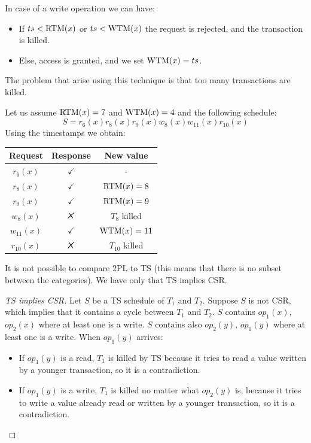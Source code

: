 \documentclass[12pt, a4paper]{report}
\newtheorem[style=M,bodystyle=\normalfont]{theorem}{Theorem}
\newtheorem[style=M,bodystyle=\normalfont]{corollary}{Corollary}
\newtheorem[style=M,bodystyle=\normalfont]{lemma}{Lemma}
\newtheorem[style=M,bodystyle=\normalfont]{definition}{Definition}
\newcommand{\tikzxmark}{%
\tikz[scale=0.23] {
    \draw[line width=0.7,line cap=round] (0,0) to [bend left=6] (1,1);
    \draw[line width=0.7,line cap=round] (0.2,0.95) to [bend right=3] (0.8,0.05);
}}
\begin{document}
    In case of a write operation we can have: 
    \begin{itemize}
        \item If $ts<\textnormal{RTM}(x)$ or $ts<\textnormal{WTM}(x)$ the request is rejected, and the  transaction is killed. 
        \item Else, access is granted, and we set $\textnormal{WTM}(x)=ts$. 
    \end{itemize}
    The problem that arise using this technique is that too many transactions are killed. 
    \begin{example}
        Let us assume $\textnormal{RTM}(x)=7$ and $\textnormal{WTM}(x)=4$ and the following schedule: 
        \[S=r_6(x) r_8(x) r_9(x) w_8(x) w_{11}(x) r_{10}(x)\]
        Using the timestamps we obtain: 
        \begin{table}[H]
            \centering
            \begin{tabular}{ccc}
            \textbf{Request} & \textbf{Response} & \textbf{New value} \\ \hline
            $r_6(x)$         & $\checkmark$      & -                  \\
            $r_8(x)$         & $\checkmark$      & $\textnormal{RTM}(x)=8$         \\
            $r_9(x)$         & $\checkmark$      & $\textnormal{RTM}(x)=9$         \\
            $w_8(x)$         & $\tikzxmark$      & $T_8$ killed       \\
            $w_{11}(x)$      & $\checkmark$      & $\textnormal{WTM}(x)=11$        \\
            $r_{10}(x)$      & $\tikzxmark$      & $T_{10}$ killed   
            \end{tabular}
        \end{table}
    \end{example}
    It is not possible to compare 2PL to TS (this means that there is no subset between the categories). We have only that TS implies CSR. 
    \begin{proof}[TS implies CSR]
        Let $S$ be a TS schedule of $T_1$ and $T_2$. Suppose $S$ is not CSR, which implies that it contains a cycle between $T_1$ and $T_2$. $S$ contains $op_1(x)$, $op_2(x)$ where at 
        least one is a write. $S$ contains also $op_2(y)$, $op_1(y)$ where at least one is a write. 
        When $op_1(y)$ arrives:
        \begin{itemize}
            \item If $op_1(y)$ is a read, $T_1$ is killed by TS because it tries to read a value written by a younger transaction, so it is a contradiction. 
            \item If $op_1(y)$ is a write, $T_1$ is killed no matter what $op_2(y)$ is, because it tries to write a value already read or written by a younger transaction, so it is a 
                contradiction. 
        \end{itemize}
    \end{proof}
\end{document}
